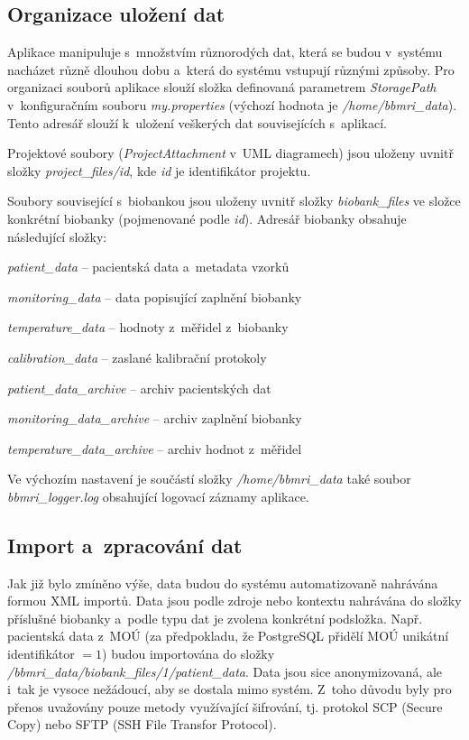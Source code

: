 \documentclass[11pt, final, oneside]{fithesis2}
\begin{document}
\subsection{Organizace uložení dat}\label{chapter:implementation:subsection:organizationOfDataStorage}
Aplikace manipuluje s~množstvím různorodých dat, která se budou v~systému nacházet různě dlouhou dobu a~která do systému vstupují různými způsoby. Pro organizaci souborů aplikace slouží složka definovaná parametrem \textit{StoragePath} v~konfiguračním souboru \textit{my.properties} (výchozí hodnota je \textit{/home/bbmri\_data}). Tento adresář slouží k~uložení veškerých dat souvisejících s~aplikací.

Projektové soubory (\textit{ProjectAttachment} v~UML diagramech) jsou uloženy uvnitř složky \textit{project\_files/id}, kde \textit{id} je identifikátor projektu. 

Soubory související s~biobankou jsou uloženy uvnitř složky \textit{biobank\_files} ve složce konkrétní biobanky (pojmenované podle \textit{id}). Adresář biobanky obsahuje následující složky: 
\begin{compactitem}
	\item \textit{patient\_data} -- pacientská data a~metadata vzorků
	\item \textit{monitoring\_data} -- data popisující zaplnění biobanky
	\item \textit{temperature\_data} -- hodnoty z~měřidel z~biobanky
	\item \textit{calibration\_data} -- zaslané kalibrační protokoly
	\item \textit{patient\_data\_archive} -- archiv pacientských dat
	\item \textit{monitoring\_data\_archive} -- archiv zaplnění biobanky
	\item \textit{temperature\_data\_archive} -- archiv hodnot z~měřidel
\end{compactitem}

Ve výchozím nastavení je součástí složky \textit{/home/bbmri\_data} také soubor \textit{bbmri\_logger.log} obsahující logovací záznamy aplikace. 

\subsection{Import a~zpracování dat}\label{chapter:implementation:subsection:import}
Jak již bylo zmíněno výše, data budou do systému automatizovaně nahrávána formou XML importů. Data jsou podle zdroje nebo kontextu nahrávána do složky příslušné biobanky a~podle typu dat je zvolena konkrétní podsložka. Např. pacientská data z~MOÚ (za předpokladu, že PostgreSQL přidělí MOÚ unikátní identifikátor $= 1$) budou importována do složky \textit{/bbmri\_data/biobank\_files/1/patient\_data}. Data jsou sice anonymizovaná, ale i~tak je vysoce nežádoucí, aby se dostala mimo systém. Z~toho důvodu byly pro přenos uvažovány pouze metody využívající šifrování, tj. protokol SCP (Secure Copy) nebo SFTP (SSH File Transfor Protocol). 
\end{document}
